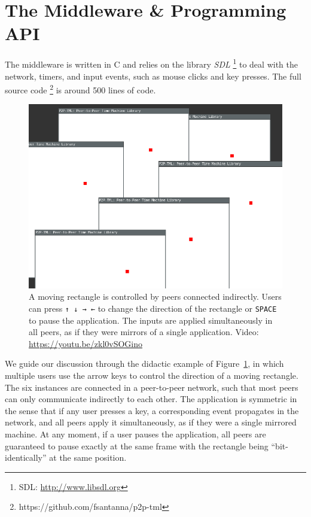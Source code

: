 \documentclass[fleqn,10pt]{SelfArx}
\newcommand{\code}[1]  {\texttt{\footnotesize{#1}}}
\begin{document}
\section{The Middleware \& Programming API}
\label{sec.tml}

The middleware is written in C and relies on the library \emph{SDL}%
\footnote{SDL: \url{http://www.libsdl.org}}
to deal with the network, timers, and input events, such as mouse clicks and
key presses.
The full source code%
\footnote{https://github.com/fsantanna/p2p-tml}
is around 500 lines of code.



\begin{figure}
    \centering
    \includegraphics[width=\linewidth]{move}
    \caption[XXX] {
        A moving rectangle is controlled by peers connected indirectly.
        Users can press \code{↑ ↓ → ←} to change the direction of the
        rectangle or \code{SPACE} to pause the application.
        The inputs are applied simultaneously in all peers, as if they were
        mirrors of a single application.
        Video: \url{https://youtu.be/zkl0vSOGino}
        \label{fig.move}
    }
\end{figure}

We guide our discussion through the didactic example of Figure~\ref{fig.move},
in which multiple users use the arrow keys to control the direction of a
moving rectangle.
The six instances are connected in a peer-to-peer network, such that most
peers can only communicate indirectly to each other.
%
The application is symmetric in the sense that if any user presses a key, a
corresponding event propagates in the network, and all peers apply it
simultaneously, as if they were a single mirrored machine.
At any moment, if a user pauses the application, all peers are guaranteed to
pause exactly at the same frame with the rectangle being ``bit-identically'' at
the same position.
\end{document}
